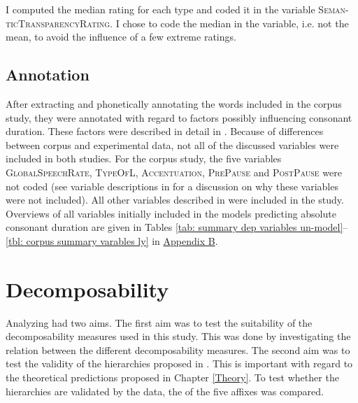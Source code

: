 I computed the median rating for each type and coded it in the variable \textsc{Seman-ticTransparencyRating}. I chose to code the median in the variable, i.e. not the mean, to avoid the influence of a few extreme ratings. 






\subsection{Annotation} \label{Overview of the Variables in the Data Set corpus}

After extracting and phonetically annotating the words included in the corpus study, they were annotated with regard to factors possibly influencing consonant duration. These factors were described in detail in . Because of differences between corpus and experimental data, not all of the discussed variables were included in both studies. For the corpus study, the five variables \textsc{GlobalSpeechRate}, \textsc{TypeOfL}, \textsc{Accentuation}, \textsc{PrePause} and \textsc{PostPause} were not coded (see variable descriptions in  for a discussion on why these variables were not included). 
All other variables described in  were included in the study. 
Overviews of all variables initially included in the models predicting absolute consonant duration are given in Tables \ref{tab: summary dep variables un-model}--\ref{tbl: corpus summary varables ly} in \hyperref[App B: Summaries of variables in initial models of corpus study]{Appendix B}. 




\section{Decomposability} \label{corpus dec}

Analyzing  had two aims. The first aim was to test the suitability of the decomposability measures used in this study. This was done by investigating the relation between the different decomposability measures.  
The second aim was to test the validity of the  hierarchies proposed in .  This is important with regard to the theoretical predictions proposed in Chapter \ref{Theory}. To test whether the hierarchies are validated by the data, the  of the five affixes was compared.




